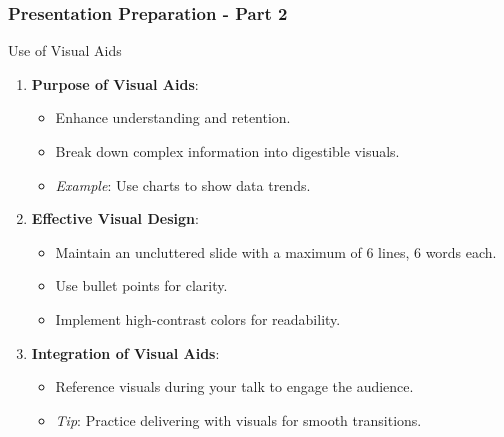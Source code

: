 \documentclass[aspectratio=169]{beamer}
\begin{document}
\begin{frame}[fragile]
    \frametitle{Presentation Preparation - Part 2}
    
    \begin{block}{Use of Visual Aids}
        \begin{enumerate}
            \item \textbf{Purpose of Visual Aids}:
            \begin{itemize}
                \item Enhance understanding and retention.
                \item Break down complex information into digestible visuals.
                \item \textit{Example}: Use charts to show data trends.
            \end{itemize}
            
            \item \textbf{Effective Visual Design}:
            \begin{itemize}
                \item Maintain an uncluttered slide with a maximum of 6 lines, 6 words each.
                \item Use bullet points for clarity.
                \item Implement high-contrast colors for readability.
            \end{itemize}
            
            \item \textbf{Integration of Visual Aids}:
            \begin{itemize}
                \item Reference visuals during your talk to engage the audience.
                \item \textit{Tip}: Practice delivering with visuals for smooth transitions.
            \end{itemize}
        \end{enumerate}
    \end{block}
    
\end{frame}
\end{document}
